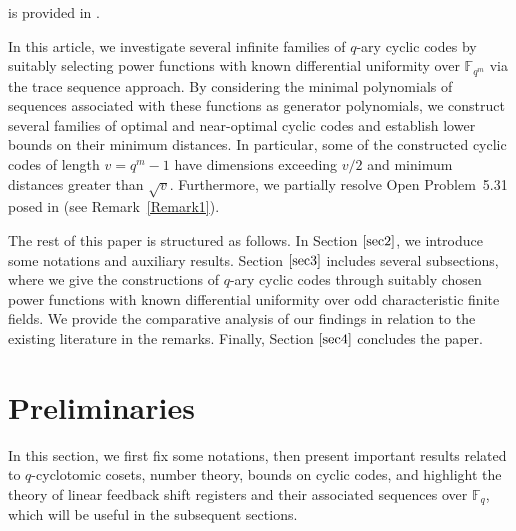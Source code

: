 \documentclass[pdflatex,sn-mathphys-num]{sn-jnl}%
\theoremstyle{thmstyleone}%
\theoremstyle{thmstyletwo}%
\theoremstyle{thmstylethree}%
\begin{document}
is provided in \cite[Table~1]{List}.  %
\par In this article, we investigate several infinite families of $q$-ary cyclic codes by suitably selecting power functions with known differential uniformity over $\mathbb{F}_{q^m}$ via the trace sequence approach. By considering the minimal polynomials of sequences associated with these functions as generator polynomials, we construct several families of optimal and near-optimal cyclic codes and establish lower bounds on their minimum distances. In particular, some of the constructed cyclic codes of length $v=q^m-1$ have dimensions exceeding $v/2$ and minimum distances greater than $\sqrt{v}$. Furthermore, we partially resolve Open Problem~5.31 posed in \cite{P3} (see Remark~\ref{Remark1}).
\par The rest of this paper is structured as follows. In Section $\ref{sec2}$, we introduce some notations and auxiliary results. Section $\ref{sec3}$ includes several subsections, where we give the constructions of $q$-ary cyclic codes through suitably chosen power functions with known differential uniformity over odd characteristic finite fields. We provide the comparative analysis of our findings in relation to the existing literature in the remarks. Finally, Section $\ref{sec4}$ concludes the paper.  %

\section{Preliminaries}\label{sec2}
In this section, we first fix some notations, then present important results related to $q$-cyclotomic cosets, number theory, bounds on cyclic codes, and highlight the theory of linear feedback shift registers and their associated sequences over $\mathbb{F}_{q}$, which will be useful in the subsequent sections. %
\end{document}
